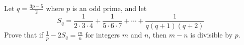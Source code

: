 Let $q = \frac{3p-5}{2}$ where $p$ is an odd prime, and let\[

S_q = \frac{1}{2\cdot 3 \cdot 4} + \frac{1}{5\cdot 6 \cdot 7} + \cdots + \frac{1}{q(q+1)(q+2)}

\]Prove that if $\frac{1}{p}-2S_q = \frac{m}{n}$ for integers $m$ and $n$,  then $m - n$ is divisible by $p$.